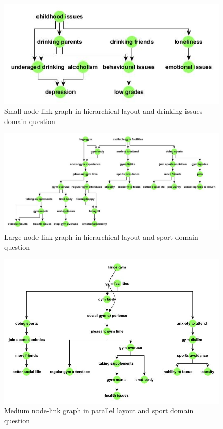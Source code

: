 \documentclass{l4proj}
\begin{document}
\begin{appendices}
\begin{figure}[H]
\centering
\includegraphics[width=12cm]{images/drinkingIssuesSmallHier.jpg}
\caption{Small node-link graph in hierarchical layout and drinking issues domain question}
\label{drinkingIssuesSmallHier}
\end{figure}


\begin{figure}
\centering
\includegraphics[width=19cm]{images/sportLargeHier.jpg}
\caption{Large node-link graph in hierarchical layout and sport domain question}
\label{SportLargeHier}
\end{figure}


\begin{figure}
\centering
\includegraphics[width=16cm]{images/sportMedParallel.jpg}
\caption{Medium node-link graph in parallel layout and sport domain question}
\label{sportMedParallel}
\end{figure}


\end{appendices}
\end{document}
